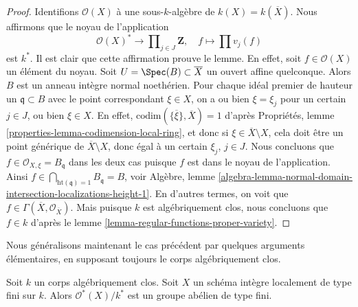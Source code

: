 \begin{proof}
\medskip\noindent
 Identifions $\mathcal{O}(X)$ à une sous-$k$-algèbre de $k(X) = k(\overline{X})$.
Nous affirmons que le noyau de l'application 
$$
\mathcal{O}(X)^* \longrightarrow
\prod\nolimits_{j \in J} \mathbf{Z},
\quad
f \longmapsto \prod v_j(f)
$$
 est $k^*$. Il est clair que cette affirmation prouve le lemme.
 En effet, soit $f \in \mathcal{O}(X)$ un élément du noyau. Soit
$U = \Spec(B) \subset \overline{X}$ un ouvert affine quelconque.
Alors $B$ est un anneau intègre normal noethérien. Pour
chaque idéal premier de hauteur un $\mathfrak q \subset B$ avec le point
correspondant $\xi \in X$, on a ou bien $\xi = \xi_j$ pour un certain $j \in J$,
ou bien $\xi \in X$. En effet, 
$\text{codim}(\overline{\{\xi\}}, \overline{X}) = 1$ d'après
Propriétés, lemme \ref{properties-lemma-codimension-local-ring},
 et donc si $\xi \in \overline{X} \setminus X$, cela doit
être un point générique de $\overline{X} \setminus X$, donc égal à un certain 
$\xi_j$, $j \in J$.
Nous concluons que $f \in \mathcal{O}_{X, \xi} = B_{\mathfrak q}$
 dans les deux cas puisque $f$ est dans le noyau de l'application. Ainsi 
$f \in \bigcap_{\text{ht}(\mathfrak q) = 1} B_{\mathfrak q} = B$,
voir Algèbre, lemme 
\ref{algebra-lemma-normal-domain-intersection-localizations-height-1}.
En d'autres termes, on voit que 
$f \in \Gamma(\overline{X}, \mathcal{O}_{\overline{X}})$.
Mais puisque $k$ est algébriquement clos, nous concluons que 
$f \in k$ d'après
le lemme \ref{lemma-regular-functions-proper-variety}. 
\end{proof}

\noindent
 Nous généralisons maintenant le cas précédent par quelques arguments élémentaires, en
supposant toujours le corps algébriquement clos.

\begin{lemma}
\label{lemma-units-integral-finite-type-algebraically-closed}
 Soit $k$ un corps algébriquement clos. Soit
$X$ un schéma intègre localement de type fini sur $k$.
Alors $\mathcal{O}^*(X)/k^*$ est un groupe abélien de type fini. 
\end{lemma}

